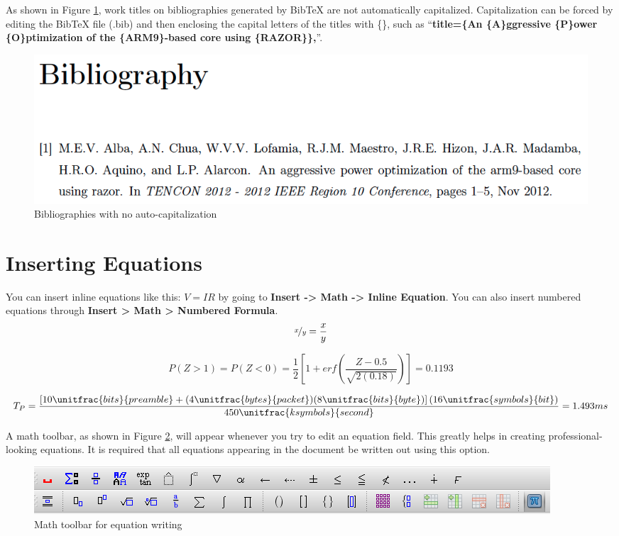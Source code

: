 As shown in Figure \ref{fig:Bibliographies-with-no}, work titles
on bibliographies generated by Bib\TeX{} are not automatically capitalized.
Capitalization can be forced by editing the Bib\TeX{} file (.bib) and
then enclosing the capital letters of the titles with \{\}, such as
``\textbf{title=\{An \{A\}ggressive \{P\}ower \{O\}ptimization of
the \{ARM9\}-based core using \{RAZOR\}\},}''.

\begin{figure}[H]
\begin{centering}
\includegraphics[width=1\columnwidth]{images/bibliography}
\par\end{centering}
\caption{Bibliographies with no auto-capitalization \label{fig:Bibliographies-with-no}}

\end{figure}

\section{Inserting Equations}

You can insert inline equations like this: $V=IR$\textbf{ }by going
to \textbf{Insert -\textgreater{} Math -\textgreater{} Inline Equation}.
You can also insert numbered equations through \textbf{Insert \textgreater{}
Math \textgreater{} Numbered Formula}. 
\begin{equation}
\nicefrac{x}{y}=\frac{x}{y}
\end{equation}

\begin{equation}
P(Z>1)=P(Z<0)=\frac{1}{2}\left[1+erf\left(\frac{Z-0.5}{\sqrt{2(0.18)}}\right)\right]=0.1193\label{eq:1}
\end{equation}

\begin{equation}
T_{P}=\frac{\left[10\unitfrac{bits}{preamble}+(4\unitfrac{bytes}{packet})(8\unitfrac{bits}{byte})\right](16\unitfrac{symbols}{bit})}{450\unitfrac{ksymbols}{second}}=1.493ms\label{eq:4-1}
\end{equation}

A math toolbar, as shown in Figure \ref{fig:Math-toolbar-for}, will
appear whenever you try to edit an equation field. This greatly helps
in creating professional-looking equations. It is required that all
equations appearing in the document be written out using this option.

\begin{figure}[H]
\begin{centering}
\includegraphics[width=0.9\columnwidth]{images/equations}
\par\end{centering}
\caption{Math toolbar for equation writing\label{fig:Math-toolbar-for}}

\end{figure}